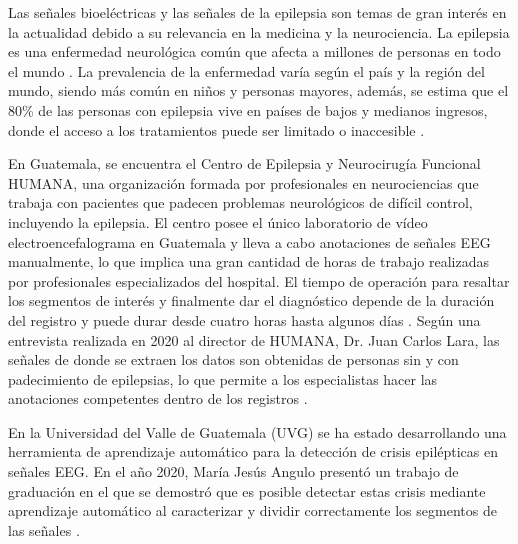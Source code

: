 Las señales bioeléctricas y las señales de la epilepsia son temas de gran interés en la actualidad debido a su relevancia en la medicina y la neurociencia. La epilepsia es una enfermedad neurológica común que afecta a millones de personas en todo el mundo \cite{pichon2017patogenia}. La prevalencia de la enfermedad varía según el país y la región del mundo, siendo más común en niños y personas mayores, además, se estima que el 80\% de las personas con epilepsia vive en países de bajos y medianos ingresos, donde el acceso a los tratamientos puede ser limitado o inaccesible \cite{Epilepsia_OMS}.

En Guatemala, se encuentra el Centro de Epilepsia y Neurocirugía Funcional HUMANA, una organización formada por profesionales en neurociencias que trabaja con pacientes que padecen problemas neurológicos de difícil control, incluyendo la epilepsia. El centro posee el único laboratorio de vídeo electroencefalograma en Guatemala y lleva a cabo anotaciones de señales EEG manualmente, lo que implica una gran cantidad de horas de trabajo realizadas por profesionales especializados del hospital. El tiempo de operación para resaltar los segmentos de interés y finalmente dar el diagnóstico depende de la duración del registro y puede durar desde cuatro horas hasta algunos días \cite{humana_2021}. Según una entrevista realizada en 2020 al director de HUMANA, Dr. Juan Carlos Lara, las señales de donde se extraen los datos son obtenidas de personas sin y con padecimiento de epilepsias, lo que permite a los especialistas hacer las anotaciones competentes dentro de los registros \cite{camila_2022}.

En la Universidad del Valle de Guatemala (UVG) se ha estado desarrollando una herramienta de aprendizaje automático para la detección de crisis epilépticas en señales EEG. En el año 2020, María Jesús Angulo presentó un trabajo de graduación en el que se demostró que es posible detectar estas crisis mediante aprendizaje automático al caracterizar y dividir correctamente los segmentos de las señales \cite{María_ang_2020}. 

